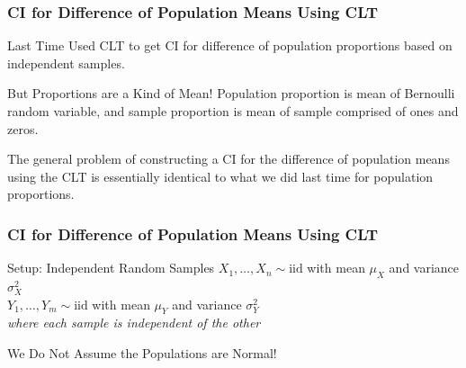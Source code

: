 \begin{frame}
\frametitle{CI for Difference of Population Means Using CLT}

\begin{block}{Last Time}
Used CLT to get CI for difference of population proportions based on independent samples.
\end{block}

\begin{block}{But Proportions are a Kind of Mean!}
Population proportion is mean of Bernoulli random variable, and sample proportion is mean of sample comprised of ones and zeros.
\end{block}

\vspace{2em}

\alert{The general problem of constructing a CI for the difference of population means using the CLT is essentially identical to what we did last time for population proportions.}

\end{frame}

\begin{frame}
\frametitle{CI for Difference of Population Means Using CLT}
\begin{block}{Setup: Independent Random Samples}
$X_1, \hdots, X_n \sim \mbox{iid}$ with mean $\mu_X$ and variance $\sigma_X^2$\\ $Y_1, \hdots, Y_m \sim \mbox{iid}$ with mean $\mu_Y$ and variance $\sigma_Y^2$\\
\emph{where each sample is independent of the other } 
\end{block}

\begin{alertblock}{We Do Not Assume the Populations are Normal!}
\end{alertblock}

\end{frame}



